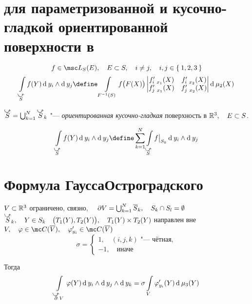 \section{ для параметризованной и кусочно-гладкой ориентированной поверхности в }

\begin{definition}
	$$ f \in \msc L_S(E), \quad E \sub S, \quad i \ne j, \quad i, j \in \set{1, 2, 3} $$
	$$ \int\limits_{\curvedir S} f(Y) \di y_i \wedge \di y_j \define \int\limits_{F^{-1}(S)} f \bigl(F(X) \bigr)
	\begin{vmatrix}
		f_{i~x_1}'(X) & f_{i~x_2}'(X) \\
		f_{j~x_1}'(X) & f_{j~x_2}'(X)
	\end{vmatrix} \di \mu_2(X) $$
\end{definition}

\begin{definition}
	$ \curvedir S = \bigcup_{k = 1}^N \curvedir S_k $ "--- \emph{ориентированная кусочно-гладкая} поверхность в $ \mathbb{R}^3, \quad E \subset S $.
	
	$$ \int\limits_{\curvedir S} f(Y) \di y_i \wedge \di y_j \define \sum_{k = 1}^N \int\limits_{\curvedir S} f\big|_{S_k}\di y_i \wedge \di y_j $$
\end{definition}

\section{Формула ГауссаОстроградского}

\begin{theorem}
	$ V \subset \mathbb{R}^3 $ ограничено, связно, $ \quad \partial V = \bigcup_{k = 1}^N \overline S_k, \quad S_k \cap S_l = \emptyset $ \\
	$ \curvedir S_k, \quad Y \in S_k \quad \bigl( T_1(Y), T_2(Y) \bigr), \quad T_1(Y) \times T_2(Y) $ направлен вне $ V, \quad \phi \in \mc C(\ol V), \quad \phi_{y_i}' \in \mc C(\ol V) $
	$$ \sigma =
	\begin{cases}
		1, \quad (i, j, k) \text{ "--- чётная}, \\
		-1, \quad \text{иначе}
	\end{cases} $$

	Тогда
	$$ \int\limits_{\curvedir \partial V} \phi(Y) \di y_i \wedge \di y_j \wedge \di y_k = \sigma \int\limits_V \phi_{y_i}'(Y) \di \mu_3(Y) $$
\end{theorem}

